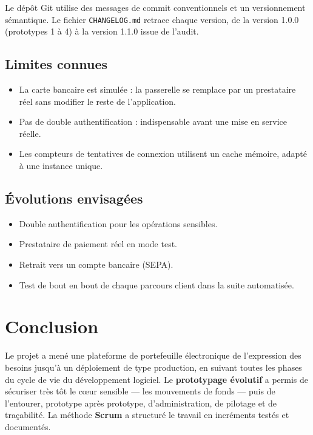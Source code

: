 \documentclass[11pt,a4paper]{report}
\newcommand{\Version}{1.1.0}
\newcommand{\code}[1]{\texttt{\small #1}}
\begin{document}
Le dépôt Git utilise des messages de commit conventionnels et un versionnement
sémantique. Le fichier \code{CHANGELOG.md} retrace chaque version, de la
version 1.0.0 (prototypes 1 à 4) à la version \Version{} issue de l'audit.

\section{Limites connues}

\begin{itemize}
  \item La carte bancaire est simulée : la passerelle se remplace par un prestataire
  réel sans modifier le reste de l'application.
  \item Pas de double authentification : indispensable avant une mise en service réelle.
  \item Les compteurs de tentatives de connexion utilisent un cache mémoire, adapté à
  une instance unique.
\end{itemize}

\section{Évolutions envisagées}

\begin{itemize}
  \item Double authentification pour les opérations sensibles.
  \item Prestataire de paiement réel en mode test.
  \item Retrait vers un compte bancaire (SEPA).
  \item Test de bout en bout de chaque parcours client dans la suite automatisée.
\end{itemize}

\chapter{Conclusion}

Le projet a mené une plateforme de portefeuille électronique de l'expression des
besoins jusqu'à un déploiement de type production, en suivant toutes les phases du
cycle de vie du développement logiciel. Le \textbf{prototypage évolutif} a permis de
sécuriser très tôt le cœur sensible --- les mouvements de fonds --- puis de l'entourer,
prototype après prototype, d'administration, de pilotage et de traçabilité. La méthode
\textbf{Scrum} a structuré le travail en incréments testés et documentés.
\end{document}
